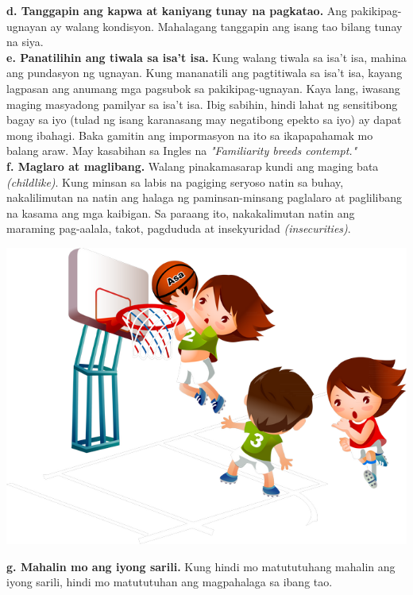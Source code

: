 \documentclass[10pt,a4paper]{article}
\begin{document}
\begin{multicols*}{3}
\begin{center}
		\end{center}
		    \textbf{d. Tanggapin ang kapwa at kaniyang tunay na pagkatao.} Ang pakikipag-ugnayan ay walang kondisyon. Mahalagang tanggapin ang isang tao bilang tunay na siya.\\
		    \textbf{e. Panatilihin ang tiwala sa isa't isa.} Kung walang tiwala sa isa't isa, mahina ang pundasyon ng ugnayan. Kung mananatili ang pagtitiwala sa isa't isa, kayang lagpasan ang anumang mga pagsubok sa pakikipag-ugnayan. Kaya lang, iwasang maging masyadong pamilyar sa isa't isa. Ibig sabihin, hindi lahat ng sensitibong bagay sa iyo (tulad ng isang karanasang may negatibong epekto sa iyo) ay dapat mong ibahagi. Baka gamitin ang impormasyon na ito sa ikapapahamak mo balang araw. May kasabihan sa Ingles na \textit{"Familiarity breeds contempt."}\\
		    \textbf{f. Maglaro at maglibang.} Walang pinakamasarap kundi ang maging bata \textit{(childlike)}. Kung minsan sa labis na pagiging seryoso natin sa buhay, nakalilimutan na natin ang halaga ng paminsan-minsang paglalaro at paglilibang na kasama ang mga kaibigan. Sa paraang ito, nakakalimutan natin ang maraming pag-aalala, takot, pagdududa at insekyuridad \textit{(insecurities)}.
		\begin{center}
			\includegraphics[width=0.8\linewidth]{G7_Modyul_Images/basketball-cartoon-sport-clip-art-kids-playing-basketball-5a96831d00a599_9354601815198134050027.png}
		\end{center}
		\textbf{g. Mahalin mo ang iyong sarili.} Kung hindi mo matututuhang mahalin ang iyong sarili, hindi mo matututuhan ang magpahalaga sa ibang tao.\\
		

\end{multicols*}
\end{document}
